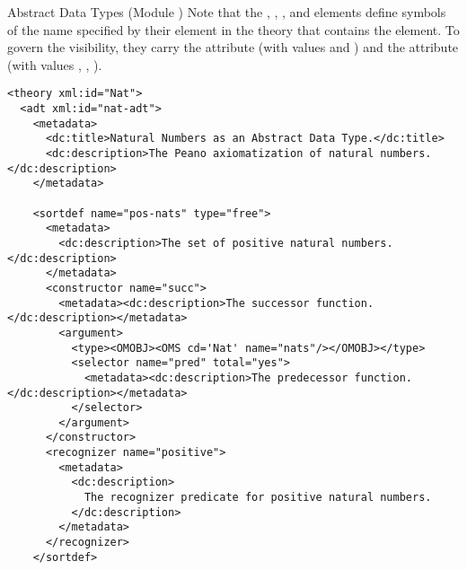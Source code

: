 \begin{tchapter}[id=adt,short=Abstract Data Types]{Abstract Data Types (Module {})}
Note that the {}, {}, {},
and {} elements define symbols of the name specified by their
{} element in the theory that contains the {}
element. To govern the visibility, they carry the attribute
{} (with values {} and
{}) and the attribute {}
(with values {}, {},
{}).
\begin{lstlisting}[label=lst:nat-adt,
  caption={The natural numbers using {\element{adt}} in {\omdoc}},
  index={adt,sortdef,constructor,argument,selector,recognizer,insort}]
<theory xml:id="Nat">
  <adt xml:id="nat-adt">
    <metadata>
      <dc:title>Natural Numbers as an Abstract Data Type.</dc:title>
      <dc:description>The Peano axiomatization of natural numbers.</dc:description>
    </metadata>

    <sortdef name="pos-nats" type="free">
      <metadata>
        <dc:description>The set of positive natural numbers.</dc:description>
      </metadata>
      <constructor name="succ">
        <metadata><dc:description>The successor function.</dc:description></metadata>
        <argument>
          <type><OMOBJ><OMS cd='Nat' name="nats"/></OMOBJ></type>
          <selector name="pred" total="yes">
            <metadata><dc:description>The predecessor function.</dc:description></metadata>
          </selector>
        </argument>
      </constructor>
      <recognizer name="positive">
        <metadata>
          <dc:description>
            The recognizer predicate for positive natural numbers.
          </dc:description>
        </metadata>
      </recognizer>
    </sortdef>


\end{lstlisting}
\end{tchapter}
